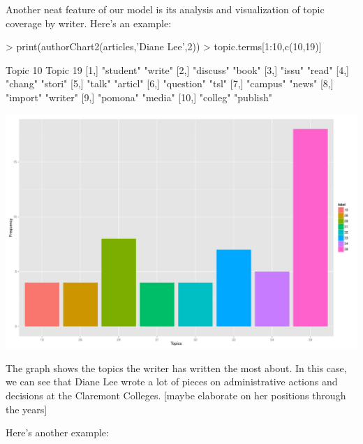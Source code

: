 \documentclass[a4paper]{article}
\begin{document}
Another neat feature of our model is its analysis and visualization of topic coverage by writer. Here's an example:

\begin{Schunk}
\begin{Sinput}
> print(authorChart2(articles,'Diane Lee',2))
> topic.terms[1:10,c(10,19)]
\end{Sinput}
\begin{Soutput}
      Topic 10   Topic 19 
 [1,] "student"  "write"  
 [2,] "discuss"  "book"   
 [3,] "issu"     "read"   
 [4,] "chang"    "stori"  
 [5,] "talk"     "articl" 
 [6,] "question" "tsl"    
 [7,] "campus"   "news"   
 [8,] "import"   "writer" 
 [9,] "pomona"   "media"  
[10,] "colleg"   "publish"
\end{Soutput}
\end{Schunk}
\includegraphics{FinalProject-010}

The graph shows the topics the writer has written the most about. In this case, we can see that Diane Lee wrote a lot of pieces on administrative actions and decisions at the Claremont Colleges.
[maybe elaborate on her positions through the years]

Here's another example:
\end{document}
